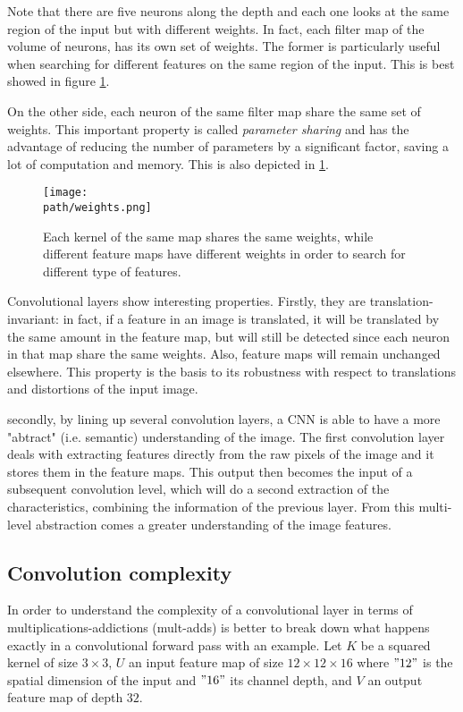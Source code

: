 Note that there are five neurons along the depth and each one looks at the same region of the input but with different weights. In fact, each filter map of the volume of neurons, has its own set of weights. The former is particularly useful when searching for different features on the same region of the input. This is best showed in figure \ref{fig:weights}. 
\newline 


On the other side, each neuron of the same filter map share the same set of weights. This important property is called \emph{parameter sharing} and has the advantage of reducing the number of parameters by a significant factor, saving a lot of computation and memory. This is also depicted in \ref{fig:weights}.  


\begin{figure}[h!]
 \centering
 \texttt{[image: \\path/weights.png]} 
 \caption{Each kernel of the same map shares the same weights, while different feature maps have different weights in order to search for different type of features.}
 \label{fig:weights}
\end{figure}



 Convolutional layers show interesting properties. Firstly, they are translation-invariant: in fact, if a feature in an image is translated, it will be translated by the same amount in the feature map, but will still be detected since each neuron in that map share the same weights. Also, feature maps will remain unchanged elsewhere. This property is the basis to its robustness with respect to translations and distortions of the input image. 
 
 secondly, by lining up several convolution layers, a CNN is able to have a more "abtract" (i.e. semantic) understanding of the image. The first convolution layer deals with extracting features directly from the raw pixels of the image and it stores them in the feature maps. This output then becomes the input of a subsequent convolution level, which will do a second extraction of the characteristics, combining the information of the previous layer. From this multi-level abstraction comes a greater understanding of the image features.
 
 
 \subsection{Convolution complexity}
 \label{subsec:cnn-complexity}
 In order to understand the complexity of a convolutional layer in terms of multiplications-addictions (mult-adds) is better to break down what happens exactly in a convolutional forward pass with an example. 
 Let $K$ be a squared kernel of size $3 \times 3$, $U$ an input feature map of size $12 \times 12 \times 16$ where $"12"$ is the spatial dimension of the input and $"16"$ its channel depth, and $V$ an output feature map of depth $32$.
 
